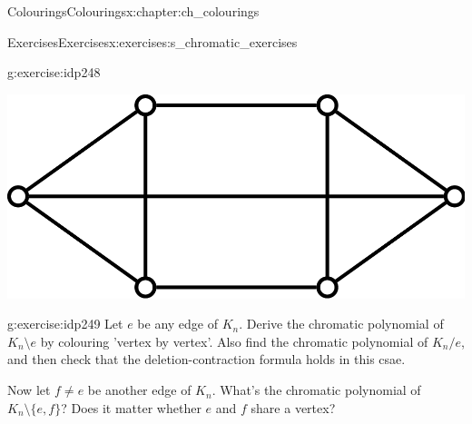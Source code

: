 \documentclass[oneside,10pt,]{book}
\numberwithin{equation}{section}
\begin{document}
\begin{chapterptx}{Colourings}{}{Colourings}{}{}{x:chapter:ch_colourings}
\begin{exercises-section}{Exercises}{}{Exercises}{}{}{x:exercises:s_chromatic_exercises}
\begin{divisionexercise}{5}{}{}{g:exercise:idp248}
\begin{image}{0}{1}{0}
\includegraphics[width=\linewidth]{images/ChromPolyProbC.png}
\end{image}%
\end{divisionexercise}%
\begin{divisionexercise}{6}{}{}{g:exercise:idp249}%
Let \(e\) be any edge of \(K_n\).  Derive the chromatic polynomial of \(K_n\setminus e\) by colouring 'vertex by vertex'.  Also find the chromatic polynomial of \(K_n/e\), and then check that the deletion-contraction formula holds in this csae.%
\par
Now let \(f\neq e\) be another edge of \(K_n\).  What's the chromatic polynomial of \(K_n\setminus\{e,f\}\)?  Does it matter whether \(e\) and \(f\) share a vertex?%
\end{divisionexercise}%
\end{exercises-section}
\end{chapterptx}
\end{document}
